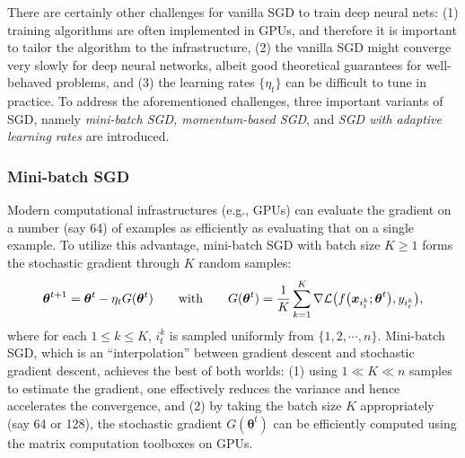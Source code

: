 There are certainly other challenges for vanilla SGD to train deep neural nets: (1) training algorithms are often implemented in GPUs, and therefore it
is important to tailor the algorithm to the infrastructure, (2) the
vanilla SGD might converge very slowly for deep neural networks,
albeit good theoretical guarantees for well-behaved problems, and (3) the learning
rates $\{\eta_{t}\}$ can be difficult to tune in practice. To address
the aforementioned challenges, three important variants of SGD, namely
\emph{mini-batch SGD, momentum-based SGD}, and \emph{SGD with adaptive
learning rates }are introduced.

\subsubsection{Mini-batch SGD}

Modern computational infrastructures (e.g., GPUs)
can evaluate the gradient on a number (say 64) of examples as efficiently
as evaluating that on a single example. To utilize this advantage, mini-batch SGD
with batch size $K\geq1$ forms the stochastic gradient through $K$
random samples:
\begin{equation}
\bm{\theta}^{t+1}=\bm{\theta}^{t}-\eta_{t}G(\bm{\theta}^{t})\qquad\text{with}\qquad G(\bm{\theta}^{t})=\frac{1}{K}\sum_{k=1}^{K}\nabla\mathcal{L}\big(f\big(\bm{x}_{i_{t}^{k}};\text{\boldmath $\theta$}^{t}\big),y_{i_{t}^{k}}\big),\label{eq:mini-SGD}
\end{equation}
where for each $1\leq k\leq K$, $i_{t}^{k}$ is sampled uniformly
from $\{1,2,\cdots,n\}$. Mini-batch SGD, which is an ``interpolation''
between gradient descent and stochastic gradient descent, achieves
the best of both worlds: (1) using $1\ll K\ll n$ samples to estimate
the gradient, one effectively reduces the variance and hence accelerates
the convergence, and (2) by taking the batch size $K$ appropriately (say
64 or 128), the stochastic gradient $G(\bm{\theta}^{t})$ can be efficiently
computed using the matrix computation toolboxes on GPUs.

